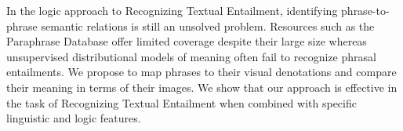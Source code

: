 In the logic approach to Recognizing Textual Entailment, identifying phrase-to-phrase semantic relations is still an unsolved problem. Resources such as the Paraphrase Database offer limited coverage despite their large size whereas unsupervised distributional models of meaning often fail to recognize phrasal entailments. We propose to map phrases to their visual denotations and compare their meaning in terms of their images. We show that our approach is effective in the task of Recognizing Textual Entailment when combined with specific linguistic and logic features.
